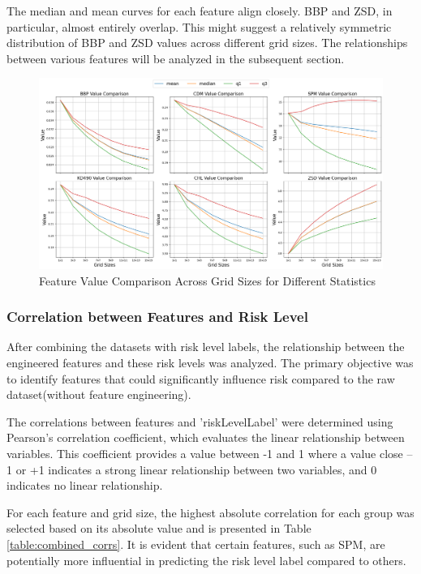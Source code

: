 \documentclass[a4paper,11pt]{report}
\begin{document}
The median and mean curves for each feature align closely. BBP and ZSD, in particular, almost entirely overlap. This might suggest a relatively symmetric distribution of BBP and ZSD values across different grid sizes. The relationships between various features will be analyzed in the subsequent section.


\begin{figure}[H]
  \centering
  \centering
    \includegraphics[width=\linewidth]{images/feature_na_eda.png}
    \caption{Feature Value Comparison Across Grid Sizes for Different Statistics}
    \label{fig:fea}

\end{figure}

\subsubsection{Correlation between Features and Risk Level}

After combining the datasets with risk level labels, the relationship between the engineered features and these risk levels was analyzed. The primary objective was to identify features that could significantly influence risk compared to the raw dataset(without feature engineering). 

The correlations between features and 'riskLevelLabel' were determined using Pearson's correlation coefficient, which evaluates the linear relationship between variables. This coefficient provides a value between -1 and 1 where a value close –1 or +1 indicates a strong linear relationship between two variables, and 0 indicates no linear relationship\citep{pearson}.

For each feature and grid size, the highest absolute correlation for each group was selected based on its absolute value and is presented in Table \ref{table:combined_corrs}. It is evident that certain features, such as SPM, are potentially more influential in predicting the risk level label compared to others. 
\end{document}
